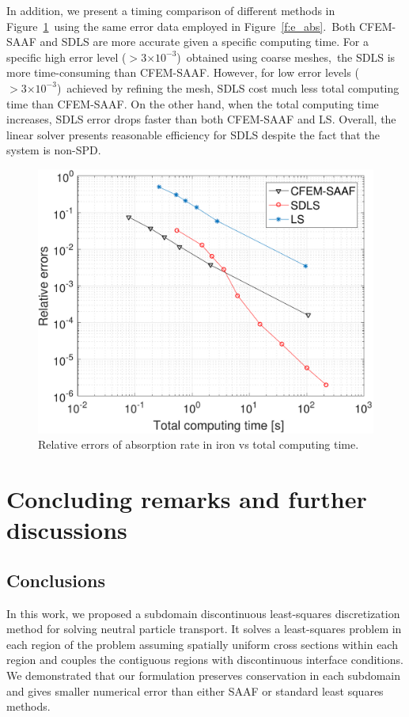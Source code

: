 \documentclass[review]{elsarticle}
\newcommand{\e}[1]{\ensuremath{\times 10^{#1}}}
\begin{document}
{In addition, we present a timing comparison of different methods in Figure\ \ref{f:e_abs-time}\ using the same error data employed in Figure\ \ref{f:e_abs}.\ Both CFEM-SAAF and SDLS are more accurate given a specific computing time. For a specific high error level ($>3\e{-3}$)\ obtained using coarse meshes,\ the SDLS is more time-consuming than CFEM-SAAF. However, for low error levels ($>3\e{-3}$)\ achieved  by refining the mesh, SDLS cost much less total computing time than CFEM-SAAF. On the other hand, when the total computing time increases, SDLS error drops faster than both CFEM-SAAF and LS. Overall, the linear solver presents reasonable efficiency for SDLS despite the fact that the system is non-SPD.}

\begin{figure}[ht!]
	\centering
	\hspace*{-0cm}\includegraphics[width=.8\linewidth]{cdls-iw-err-time.pdf}
	\caption{Relative errors of absorption rate in iron vs total computing time.}
	\label{f:e_abs-time}
\end{figure}
\section{Concluding remarks and further discussions}\label{s:conc}
\subsection{Conclusions}
In this work, we proposed a subdomain discontinuous least-squares discretization method for solving neutral particle transport. It solves a least-squares problem {in} each region of the problem {assuming spatially uniform cross sections within each region} and couples the contiguous regions with discontinuous interface conditions. We demonstrated that our formulation preserves conservation in each subdomain and gives smaller numerical error than either SAAF or standard least squares methods. 
\end{document}
